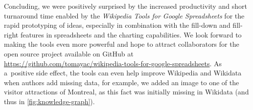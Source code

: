 \documentclass{sig-alternate-05-2015}
\newcommand{\inlinelistingsize}{\fontsize{8pt}{11pt}}
\let\oldurl\url
\renewcommand{\url}[1]{\inlinelistingsize\oldurl{#1}}
\begin{document}
Concluding, we were positively surprised by the increased productivity
and short turnaround time enabled by the \emph{Wikipedia Tools for Google Spreadsheets}
for the rapid prototyping of ideas, especially in combination with the fill-down and fill-right
features in spreadsheets and the charting capabilities.
We look forward to making the tools even more powerful
and hope to attract collaborators for the open source project
available on GitHub at \url{https://github.com/tomayac/wikipedia-tools-for-google-spreadsheets}.
As a~positive side effect, the tools can even help improve Wikipedia and Wikidata
when authors add missing data, for example, we added an image to one of the visitor attractions
of Montreal, as this fact was initially missing in Wikidata (and thus in \autoref{fig:knowledge-graph}).


\normalsize


\end{document}
